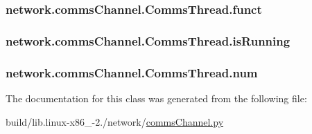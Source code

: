 \subsubsection[{funct}]{\setlength{\rightskip}{0pt plus 5cm}network.\+comms\+Channel.\+Comms\+Thread.\+funct}\label{classnetwork_1_1commsChannel_1_1CommsThread_a84740c23a68c30c4ae6596cb4a023661}
\hypertarget{classnetwork_1_1commsChannel_1_1CommsThread_a19b489cfef0f927e73c891f06f971745}{}
\subsubsection[{is\+Running}]{\setlength{\rightskip}{0pt plus 5cm}network.\+comms\+Channel.\+Comms\+Thread.\+is\+Running}\label{classnetwork_1_1commsChannel_1_1CommsThread_a19b489cfef0f927e73c891f06f971745}
\hypertarget{classnetwork_1_1commsChannel_1_1CommsThread_a2201049bdb76e1bff371c2ef1446eeb6}{}
\subsubsection[{num}]{\setlength{\rightskip}{0pt plus 5cm}network.\+comms\+Channel.\+Comms\+Thread.\+num}\label{classnetwork_1_1commsChannel_1_1CommsThread_a2201049bdb76e1bff371c2ef1446eeb6}


The documentation for this class was generated from the following file\+:\begin{DoxyCompactItemize}
\item 
build/lib.\+linux-\/x86\+\_-\/2./network/\hyperlink{build_2lib_8linux-x86__64-2_87_2network_2commsChannel_8py}{comms\+Channel.\+py}\end{DoxyCompactItemize}
